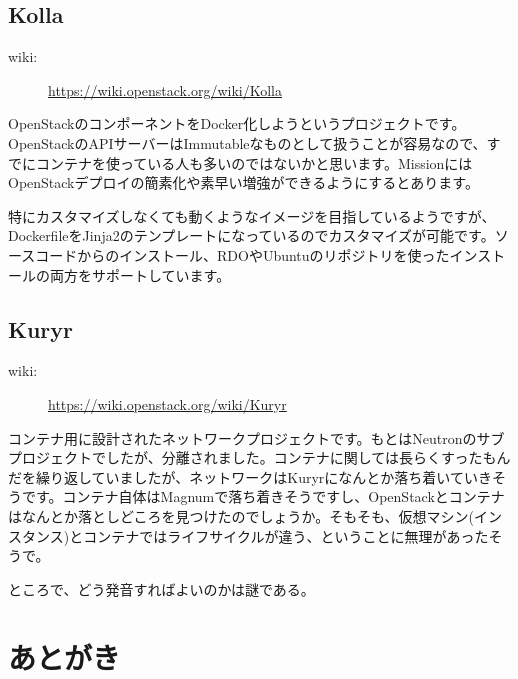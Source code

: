 \documentclass[10pt,b5paper,tombo,openany]{jsbook}
\begin{document}
\section{Kolla}
\begin{description}
	\item[wiki:] \url{https://wiki.openstack.org/wiki/Kolla}
\end{description}
OpenStackのコンポーネントをDocker化しようというプロジェクトです。OpenStackのAPIサーバーはImmutableなものとして扱うことが容易なので、すでにコンテナを使っている人も多いのではないかと思います。MissionにはOpenStackデプロイの簡素化や素早い増強ができるようにするとあります。

特にカスタマイズしなくても動くようなイメージを目指しているようですが、DockerfileをJinja2のテンプレートになっているのでカスタマイズが可能です。ソースコードからのインストール、RDOやUbuntuのリポジトリを使ったインストールの両方をサポートしています。

\section{Kuryr}
\begin{description}
	\item[wiki:] \url{https://wiki.openstack.org/wiki/Kuryr}
\end{description}
コンテナ用に設計されたネットワークプロジェクトです。もとはNeutronのサブプロジェクトでしたが、分離されました。コンテナに関しては長らくすったもんだを繰り返していましたが、ネットワークはKuryrになんとか落ち着いていきそうです。コンテナ自体はMagnumで落ち着きそうですし、OpenStackとコンテナはなんとか落としどころを見つけたのでしょうか。そもそも、仮想マシン(インスタンス)とコンテナではライフサイクルが違う、ということに無理があったそうで。

ところで、どう発音すればよいのかは謎である。

\chapter{あとがき}
\end{document}
